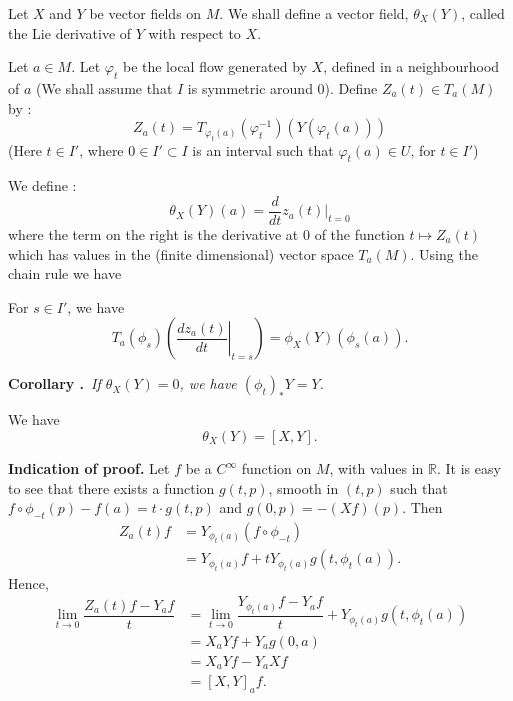 Let $X$ and $Y$ be vector fields on $M$. We shall define a vector field, $\theta_{X}(Y)$, called the Lie derivative of $Y$ with respect to $X$.

Let $a\in M$. Let $\varphi_{t}$ be the local flow generated by $X$, defined in a neighbourhood of $a$ (We shall assume that $I$ is symmetric around $0$). Define $Z_{a}(t)\in T_{a}(M)$ by :
$$
Z_{a}(t)=T_{\varphi_{t}(a)}(\varphi^{-1}_{t})(Y(\varphi_{t}(a)))
$$
(Here $t\in I'$, where $0\in I'\subset I$ is an interval such that $\varphi_{t}(a)\in U$, for $t\in I'$)

We define :
$$
\theta_{X}(Y)(a)=\dfrac{d}{dt}z_{a}(t)\big|_{t=0}
$$
where the term on the right is the derivative at $0$ of the function $t\mapsto Z_{a}(t)$\pageoriginale which has values in the (finite dimensional) vector space $T_{a}(M)$. Using the chain rule we have

\begin{lemma}\label{chap6-lem6.4}
For $s\in I'$, we have
$$
T_{a}(\phi_{s})\left(\left.\dfrac{dz_{a}(t)}{dt}\right|_{t=s}\right)=\phi_{X}(Y)(\phi_{s}(a)).
$$
\end{lemma}

\noindent
{\bf Corollary .\label{chap6-coro6.4.1}}~{\em If $\theta_{X}(Y)=0$, we have $(\phi_{t})_{*}Y=Y$.}

\begin{theorem}\label{chap6-thm6.5}
We have
$$
\theta_{X}(Y)=[X,Y].
$$
\end{theorem}

\noindent
{\bf Indication of proof.}
Let $f$ be a $C^{\infty}$ function on $M$, with values in $\mathbb{R}$. It is easy to see that there exists a function $g(t,p)$, smooth in $(t,p)$ such that $f\circ \phi_{-t}(p)-f(a)=t\cdot g(t,p)$ and $g(0,p)=-(Xf)(p)$. Then 
\begin{align*}
Z_{a}(t)f &= Y_{\phi_{t}(a)}(f\circ \phi_{-t})\\[3pt]
         &= Y_{\phi_{t}(a)}f+tY_{\phi_{t}(a)}g(t,\phi_{t}(a)).
\end{align*}
Hence,
\begin{align*}
\lim\limits_{t\to 0}\dfrac{Z_{a}(t)f-Y_{a}f}{t} &= \lim\limits_{t\to 0}\dfrac{Y_{\phi_{t}(a)}f-Y_{a}f}{t}+Y_{\phi_{t}(a)}g(t,\phi_{t}(a))\\[3pt]
                                             &= X_{a}Yf+Y_{a}g(0,a)\\[3pt]
                                             &= X_{a}Yf-Y_{a}Xf\\[3pt]
                                             &= [X,Y]_{a}f.
\end{align*}

